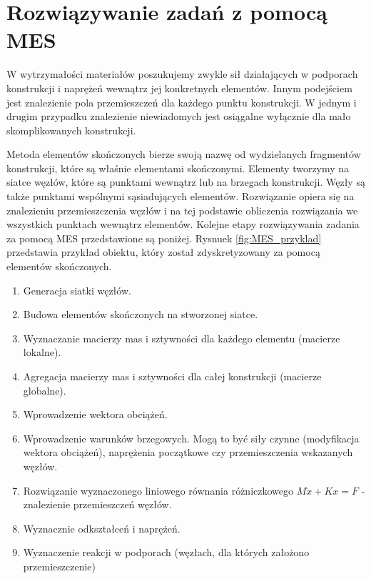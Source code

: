 
\section{Rozwiązywanie zadań z  pomocą MES}
\label{sec:rozwiazwyanie_zadan}

W wytrzymałości materiałów poszukujemy zwykle sił działających w podporach konstrukcji i naprężeń wewnątrz jej konkretnych elementów. Innym podejściem jest znalezienie pola przemieszczeń dla każdego punktu konstrukcji.  W jednym i drugim przypadku znalezienie niewiadomych jest osiągalne wyłącznie dla mało skomplikowanych konstrukcji.

Metoda elementów skończonych bierze swoją nazwę od wydzielanych fragmentów konstrukcji, które są właśnie elementami skończonymi. Elementy tworzymy na siatce węzłów, które są punktami wewnątrz lub na brzegach konstrukcji. Węzły są także punktami wspólnymi sąsiadujących elementów. Rozwiązanie opiera się na znalezieniu przemieszczenia węzłów i na tej podstawie obliczenia rozwiązania we wszystkich punktach wewnątrz elementów. Kolejne etapy rozwiązywania zadania za pomocą MES przedstawione są poniżej. Rysnuek \ref{fig:MES_przyklad} przedstawia przykład obiektu, który został zdyskretyzowany za pomocą elementów skończonych.

\vspace{5 mm}

\begin{enumerate}
  \item Generacja siatki węzłów.
  \item Budowa elementów skończonych na stworzonej siatce.
  \item Wyznaczanie macierzy mas i sztywności dla każdego elementu (macierze lokalne).
  \item Agregacja macierzy mas  i sztywności dla całej konstrukcji (macierze globalne).
  \item Wprowadzenie wektora obciążeń.
  \item Wprowadzenie warunków brzegowych. Mogą to być siły czynne (modyfikacja wektora obciążeń), naprężenia początkowe czy przemieszczenia wskazanych węzłów.
  \item Rozwiązanie wyznaczonego liniowego równania różniczkowego \( M \ddot x + Kx = F \) - znalezienie przemieszczeń węzłów.
  \item Wyznacznie odkształceń i naprężeń.
  \item Wyznaczenie reakcji w podporach (węzłach, dla których założono przemieszczenie)
\end{enumerate}


